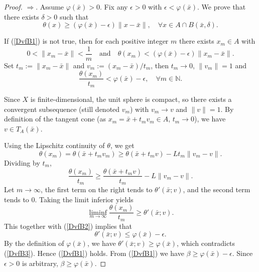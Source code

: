 \documentclass[11pt]{article}
\begin{document}
\begin{proof}    $\Rightarrow$.   Assume $\varphi (\bar x) > 0$.   
	Fix any $\epsilon >0$ with $\epsilon <	\varphi (\bar x)$. We prove that there exists $\delta > 0$ such that
	\begin{equation}\label{DvfB1}
		\theta(x) \ge \left( 	\varphi (\bar x)-\epsilon \right) \|x - \bar x\|, \quad \forall x \in A \cap B(\bar x, \delta).
	\end{equation}
	
	
	
	If (\ref{DvfB1}) is not true, then for each positive integer $m$ there exists $x_m \in A$ with
	\[
	0 < \|x_m - \bar x\| < \frac{1}{m} \quad\text{and}\quad \theta(x_m) < \left( 	\varphi (\bar x) - \epsilon \right) \|x_m - \bar x\|.
	\]
	Set $t_m := \|x_m - \bar x\|$ and $v_m := (x_m - \bar x)/t_m$,  then    $t_m   \to 0  $,     $\|v_m\| = 1$ and
	\begin{equation}\label{DvfB2}
		\frac{\theta(x_m)}{t_m} < 	\varphi (\bar x) -\epsilon , \quad \forall m    \in \mathbb{N}.  
	\end{equation}
	
	Since $X$ is finite-dimensional, the unit sphere is compact, so there exists a convergent subsequence (still denoted $v_m$) with $v_m \to v$ and $\|v\| = 1$. By definition of the tangent cone (as $x_m = \bar x + t_m v_m \in A$, $t_m \to 0$),     we have      $v \in T_A(\bar x)$.
	
	Using the Lipschitz continuity of $\theta$,  we get
	\[
	\theta(x_m) = \theta(\bar x + t_m v_m) \ge \theta(\bar x + t_m v) - L t_m \|v_m - v\|.
	\]
	Dividing by $t_m$,
	\[
	\frac{\theta(x_m)}{t_m} \ge \frac{\theta(\bar x + t_m v)}{t_m} - L \|v_m - v\|.
	\]
	Let $m \to \infty$, the first term on the right tends to $\theta'(\bar x; v)$, and the second term tends to $0$. Taking the limit inferior yields
	\[
	\liminf_{m \to \infty} \frac{\theta(x_m)}{t_m} \ge \theta'(\bar x; v).
	\]
	This together with  (\ref{DvfB2})  implies that 
	\begin{equation}\label{DvfB3}
		\theta'(\bar x; v) \le 	\varphi (\bar x) -\epsilon. 
	\end{equation}
	By the definition of $\varphi (\bar x)$,  we have $\theta'(\bar x; v) \ge 	\varphi (\bar x)$,  which contradicts (\ref{DvfB3}). 
	Hence (\ref{DvfB1}) holds.
	From (\ref{DvfB1}) we have $\beta \ge 	\varphi (\bar x) -\epsilon$. Since $\epsilon>0$ is arbitrary, $\beta \ge 	\varphi (\bar x)$.
	

\end{proof}
\end{document}
